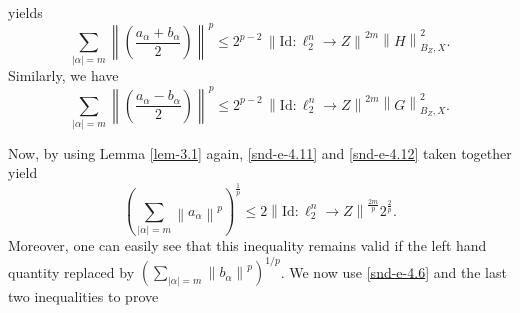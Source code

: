 \documentclass[a4paper,11pt, reqno]{amsart}
\theoremstyle{definition}
\newcommand{\real}{{\operatorname{Re}\,}}
\newcommand{\norm}[1]{\left\lVert#1\right\rVert}
\newcommand{\comment}[1]{}
\begin{document}
	yields
	\begin{equation} \label{snd-e-4.11}
		\sum_{|\alpha|=m} \norm{\left(\frac{a_{\alpha} + b_{\alpha}}{2}\right)}^p\leq 2^{p-2}\, \norm{\mathrm{Id}:\ell^n _2 \rightarrow Z}^{2m} \norm{H}^2_{B_{Z},X}.	
	\end{equation}
	Similarly, we have 
	\begin{equation} \label{snd-e-4.12}
		\sum_{|\alpha|=m} \norm{\left(\frac{a_{\alpha} - b_{\alpha}}{2}\right)}^p\leq 2^{p-2}\, \norm{\mathrm{Id}:\ell^n _2 \rightarrow Z}^{2m} \norm{G}^2_{B_{Z},X}.
	\end{equation}
	\comment{\begin{align} \label{e-1.24}
			\sum_{|\alpha|=m} \norm{\left(\frac{a_{\alpha} + b_{\alpha}}{2}\right)z^{\alpha}}^p \nonumber
			& \leq \sum_{|\alpha|=m} \norm{\left(\frac{a_{\alpha} + b_{\alpha}}{2}\right)z^{\alpha}}^2 \\ \nonumber
			& \leq  \sum_{|\alpha|=m} \norm{\left(\frac{a_{\alpha} + b_{\alpha}}{2}\right)}^2 \\ 
			& \leq  \norm{I:\ell^n _2 \rightarrow Z}^{2m} \norm{H}^2_{B_{Z},X}.
		\end{align}
		Similarly,
		\begin{equation} \label{e-1.25}
			\sum_{|\alpha|=m} \norm{\left(\frac{a_{\alpha} - b_{\alpha}}{2}\right)z^{\alpha}}^p \leq \norm{I:\ell^n _2 \rightarrow Z}^{2m} \norm{G}^2_{B_{Z},X}.
	\end{equation}}
	Now, by using Lemma \ref{lem-3.1} again, \eqref{snd-e-4.11} and \eqref{snd-e-4.12} taken together yield 
	$$\left(\sum_{|\alpha|=m} \norm{a_{\alpha}}^p\right)^{\frac{1}{p}}  \leq 2 \norm{\mathrm{Id}:\ell^n _2 \rightarrow Z}^{\frac{2m}{p}}  2^{\frac{2}{p}}.$$
	Moreover, one can easily see that this inequality remains valid if the left hand quantity replaced by $\left(\sum_{|\alpha|=m} \norm{b_{\alpha}}^p\right)^{1/p} $.
	We now use \eqref{snd-e-4.6} and the last two inequalities to prove %
\end{document}
